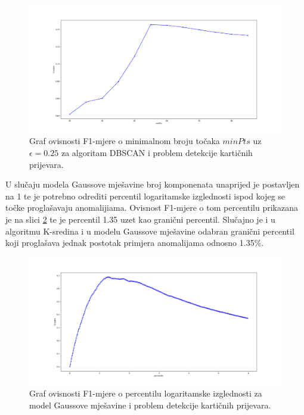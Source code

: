 \documentclass[utf8, diplomski, numeric]{fer}
\begin{document}
\begin{figure}[h!]
\includegraphics[width=1\textwidth]{images/credit-dbscan-f1.png}
\centering
\caption{Graf ovisnosti F1-mjere o minimalnom broju točaka $minPts$ uz $\epsilon = 0.25$ za algoritam DBSCAN i problem detekcije kartičnih prijevara.}
\label{fig:credit-dbscan}
\end{figure}

U slučaju modela Gaussove mješavine broj komponenata unaprijed je postavljen na 1 te je potrebno odrediti percentil logaritamske izglednosti ispod kojeg se točke proglašavaju anomalijiama. Ovisnost F1-mjere o tom percentilu prikazana je na slici \ref{fig:credit-gauss} te je percentil 1.35 uzet kao granični percentil. Slučajno je i u algoritmu K-sredina i u modelu Gaussove mješavine odabran granični percentil koji proglašava jednak postotak primjera anomalijama odnosno 1.35\%.

\begin{figure}[h!]
\includegraphics[width=1\textwidth]{images/credit-gauss-f1.png}
\centering
\caption{Graf ovisnosti F1-mjere o percentilu logaritamske izglednosti za model Gaussove mješavine i problem detekcije kartičnih prijevara.}
\label{fig:credit-gauss}
\end{figure}
\end{document}
